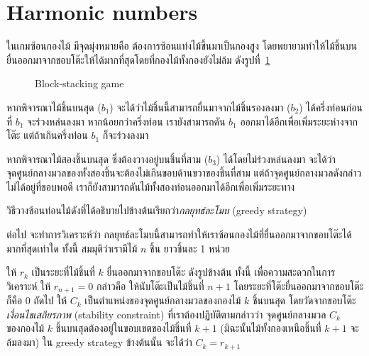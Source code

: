 \section{Harmonic numbers}

ในเกมซ้อนกองไม้ มีจุดมุ่งหมายคือ ต้องการซ้อนแท่งไม้ขึ้นมาเป็นกองสูง โดยพยายามทำให้ไม้ชิ้นบนยื่นออกมาจากขอบโต๊ะให้ได้มากที่สุดโดยที่กองไม้ทั้งกองยังไม่ล้ม ดังรูปที่~\ref{fig:book-stacking}
%
\begin{figure}
\begin{center}
\end{center}
\caption{Block-stacking game}
\label{fig:book-stacking}
\end{figure}
%
\enskip หากพิจารณาไม้ชิ้นบนสุด ($b_1$) จะได้ว่าไม้ชิ้นนี้สามารถยื่นมาจากไม้ชิ้นรองลงมา ($b_2$) ได้ครึ่งท่อนก่อนที่ $b_1$ จะร่วงหล่นลงมา \enskip หากน้อยกว่าครึ่งท่อน เรายังสามารถดัน $b_1$ ออกมาได้อีกเพื่อเพิ่มระยะห่างจากโต๊ะ แต่ถ้าเกินครึ่งท่อน $b_1$ ก็จะร่วงลงมา

หากพิจารณาไม้สองชิ้นบนสุด ซึ่งต้องวางอยู่บนชิ้นที่สาม ($b_3$) ได้โดยไม่ร่วงหล่นลงมา จะได้ว่า จุดศูนย์กลางมวลของทั้งสองชิ้นจะต้องไม่เกินขอบด้านขวาของชิ้นที่สาม แต่ถ้าจุดศูนย์กลางมวลดังกล่าวไม่ได้อยู่ที่ขอบพอดี เราก็ยังสามารถดันไม้ทั้งสองท่อนออกมาได้อีกเพื่อเพิ่มระยะทาง

วิธีวางซ้อนท่อนไม้ดังที่ได้อธิบายไปข้างต้นเรียกว่า\emph{กลยุทธ์ละโมบ} (greedy strategy)

ต่อไป จะทำการวิเคราะห์ว่า กลยุทธ์ละโมบนี้สามารถทำให้เราซ้อนกองไม้ที่ยื่นออกมาจากขอบโต๊ะได้มากที่สุดเท่าใด \enskip ทั้งนี้ สมมุติว่าเรามีไม้ $n$ ชิ้น ยาวชิ้นละ 1 หน่วย

ให้ $r_k$ เป็นระยะที่ไม้ชิ้นที่ $k$ ยื่นออกมาจากขอบโต๊ะ ดังรูปข้างต้น \enskip ทั้งนี้ เพื่อความสะดวกในการวิเคราะห์ ให้ $r_{n+1}=0$ กล่าวคือ ให้นับโต๊ะเป็นไม้ชิ้นที่ $n+1$ โดยระยะที่โต๊ะยื่นออกมาจากขอบโต๊ะก็คือ 0 \enskip ถัดไป ให้ $C_k$ เป็นตำแหน่งของจุดศูนย์กลางมวลของกองไม้ $k$ ชิ้นบนสุด โดยวัดจากขอบโต๊ะ \enskip \emph{เงื่อนไขเสถียรภาพ} (stability constraint) ที่เราต้องปฏิบัติตามกล่าวว่า จุดศูนย์กลางมวล $C_k$ ของกองไม้ $k$ ชิ้นบนสุดต้องอยู่ในขอบเขตของไม้ชิ้นที่ $k+1$ (มิฉะนั้นไม้ทั้งกองเหนือชิ้นที่ $k+1$ จะล้มลงมา) \enskip ใน greedy strategy ข้างต้นนั้น จะได้ว่า $C_k=r_{k+1}$


